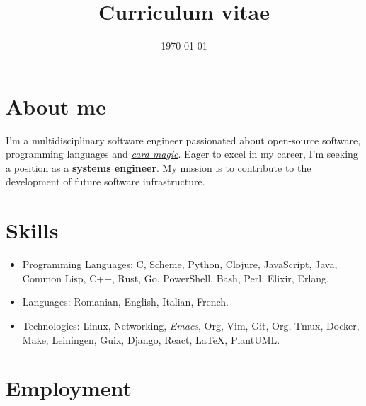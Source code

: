 \documentclass{moderncv}
\date{\today}
\title{Curriculum vitae}
\begin{document}
\maketitle

\section{About me}
\label{sec:orgf2d4af2}
I'm a multidisciplinary software engineer passionated 
about open-source software, programming languages 
and \href{https://www.youtube.com/watch?v=S9T6VeXbfkQ}{\emph{card magic}}. Eager to excel in my career, 
I'm seeking a position as a \textbf{systems engineer}. 
My mission is to contribute to the development 
of future software infrastructure.

\section{Skills}
\label{sec:orgb033e75}
\begin{itemize}
\item Programming Languages: C, Scheme, Python, Clojure, 
JavaScript, Java, Common Lisp, C++, Rust, Go, 
PowerShell, Bash, Perl, Elixir, Erlang.
\item Languages: Romanian, English, Italian, French.
\item Technologies: Linux, Networking, \emph{Emacs}, Org, Vim, 
Git, Org, Tmux, Docker, Make, Leiningen, Guix,  
Django, React, \LaTeX{}, PlantUML.
\end{itemize}
\section{Employment}
\label{sec:org76a1294}
\end{document}
